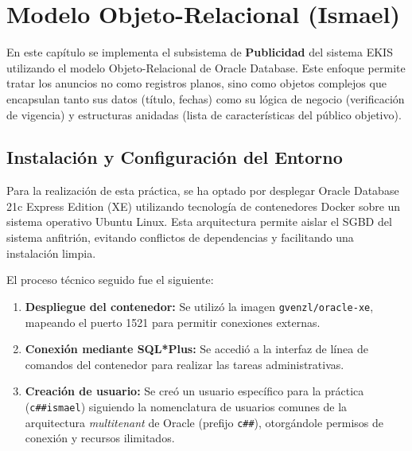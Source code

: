 \chapter{Modelo Objeto-Relacional (Ismael)}
\label{ch:ismael}

En este capítulo se implementa el subsistema de \textbf{Publicidad} del sistema EKIS utilizando el modelo Objeto-Relacional de Oracle Database. Este enfoque permite tratar los anuncios no como registros planos, sino como objetos complejos que encapsulan tanto sus datos (título, fechas) como su lógica de negocio (verificación de vigencia) y estructuras anidadas (lista de características del público objetivo).

\section{Instalación y Configuración del Entorno}

Para la realización de esta práctica, se ha optado por desplegar Oracle Database 21c Express Edition (XE) utilizando tecnología de contenedores Docker sobre un sistema operativo Ubuntu Linux. Esta arquitectura permite aislar el SGBD del sistema anfitrión, evitando conflictos de dependencias y facilitando una instalación limpia.

El proceso técnico seguido fue el siguiente:

\begin{enumerate}
    \item \textbf{Despliegue del contenedor:} Se utilizó la imagen \texttt{gvenzl/oracle-xe}, mapeando el puerto 1521 para permitir conexiones externas.
    \item \textbf{Conexión mediante SQL*Plus:} Se accedió a la interfaz de línea de comandos del contenedor para realizar las tareas administrativas.
    \item \textbf{Creación de usuario:} Se creó un usuario específico para la práctica (\texttt{c\#\#ismael}) siguiendo la nomenclatura de usuarios comunes de la arquitectura \textit{multitenant} de Oracle (prefijo \texttt{c\#\#}), otorgándole permisos de conexión y recursos ilimitados.
\end{enumerate}

